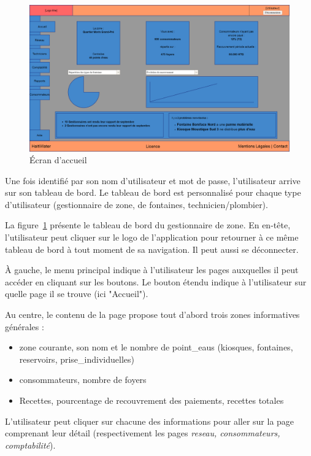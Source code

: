 \documentclass[a4paper, 11pt]{article}
\begin{document}
    \begin{figure}[H]
        \centering
        \includegraphics[width=.8\textwidth]{Cahier_des_Charges/accueil}
        \caption{\'Ecran d'accueil}
        \label{fig:zone_dashboard}
    \end{figure}

    Une fois identifié par son nom d'\gls{utilisateur} et mot de passe, l'\gls{utilisateur} arrive sur son tableau de bord. Le tableau de bord est personnalisé pour chaque type d'\gls{utilisateur} (gestionnaire de \gls{zone}, de \glspl{fontaine}, technicien/plombier).

    La figure~\ref{fig:zone_dashboard} présente le tableau de bord du gestionnaire de \gls{zone}. En en-tête, l'\gls{utilisateur} peut cliquer sur le logo de l'\gls{application} pour retourner à ce même tableau de bord à tout moment de sa navigation. Il peut aussi se déconnecter.

    À gauche, le menu principal indique à l'\gls{utilisateur} les pages auxquelles il peut accéder en cliquant sur les boutons. Le bouton étendu indique à l'\gls{utilisateur} sur quelle page il se trouve (ici "Accueil").

    Au centre, le contenu de la page propose tout d'abord trois \glspl{zone} informatives générales :
    \begin{itemize}
      \item \gls{zone} courante, son nom et le nombre de \glspl{point_eau} (kiosques, \glspl{fontaine}, \glspl{reservoir}, \glspl{prise_individuelle})
      \item \glspl{consommateur}, nombre de foyers
      \item Recettes, pourcentage de recouvrement des paiements, recettes totales
    \end{itemize}
    L'\gls{utilisateur} peut cliquer sur chacune des informations pour aller sur la page comprenant leur détail (respectivement les pages \emph{\gls{reseau}, \glspl{consommateur}, comptabilité}).
\end{document}

